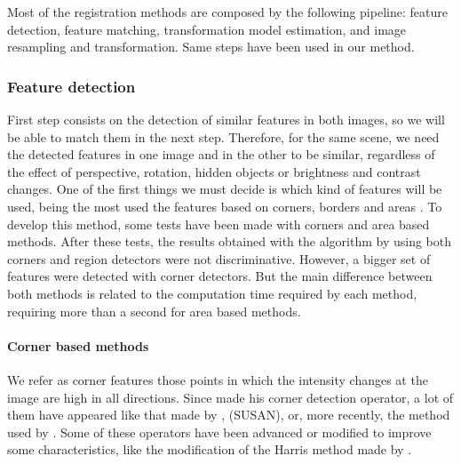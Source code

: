 Most of the registration methods are composed by the following pipeline: feature detection, feature matching, transformation model estimation, and image resampling and transformation. Same steps have been used in our method.

\subsubsection{Feature detection}\label{ch:chapter01_01_02_01}

First step consists on the detection of similar features in both images, so we will be able to match them in the next step. Therefore, for the same scene, we need the detected features in one image and in the other to be similar, regardless of the effect of perspective, rotation, hidden objects or brightness and contrast changes. One of the first things we must decide is which kind of features will be used, being the most used the features based on corners, borders and areas \citep{li2008comprehensive}. To develop this method, some tests have been made with corners and area based methods. After these tests, the results obtained with the algorithm by using both corners and region detectors were not discriminative. However, a bigger set of features were detected with corner detectors. But the main difference between both methods is related to the computation time required by each method, requiring more than a second for area based methods.

\paragraph{Corner based methods}\label{ch:chapter01_01_02_01_01}

We refer as corner features those points in which the intensity changes at the image are high in all directions. Since \cite{hans1977towards} made his corner detection operator, a lot of them have appeared like that made by \cite{harris1988combined}, \cite{smith1997susan} (SUSAN), or, more recently, the method used by \cite{rosten2006machine}. Some of these operators have been advanced or modified to improve some characteristics, like the modification of the Harris method made by \cite{shi1994good}.

